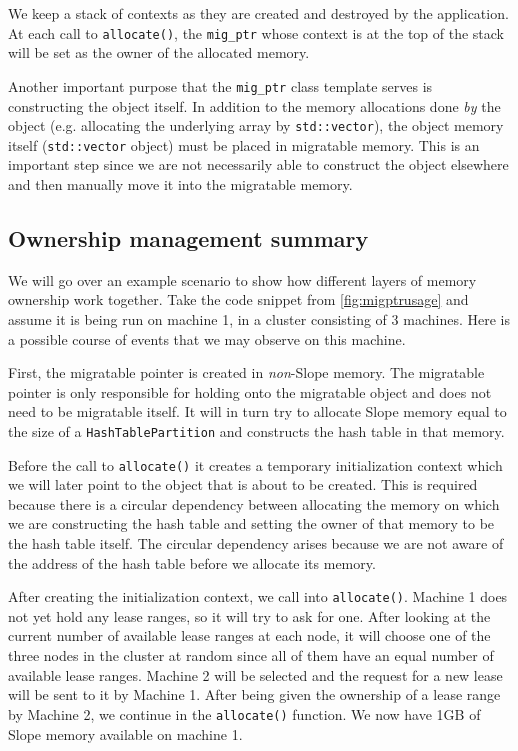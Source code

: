 We keep a stack of contexts as they are created and destroyed by the application.
At each call to \texttt{allocate()}, the \texttt{mig\_ptr} whose context is at
the top of the stack will be set as the owner of the allocated memory.

Another important purpose that the \texttt{mig\_ptr} class template serves is
constructing the object itself. In addition to the memory allocations done
\emph{by} the object (e.g. allocating the underlying array by \texttt{std::vector}),
the object memory itself (\texttt{std::vector} object) must be placed in
migratable memory. This is an important step since we are not necessarily able
to construct the object elsewhere and then manually move it into the migratable
memory.

\subsection{Ownership management summary}
We will go over an example scenario to show how different layers of memory
ownership work together. Take the code snippet from \autoref{fig:migptrusage}
and assume it is being run on machine 1, in a cluster consisting of 3 machines.
Here is a possible course of events that we may observe on this machine.

First, the migratable pointer is created in \emph{non}-Slope memory. The
migratable pointer is only responsible for holding onto the migratable object
and does not need to be migratable itself. It will in turn try to allocate
Slope memory equal to the size of a \texttt{HashTablePartition} and constructs the
hash table in that memory.

Before the call to \texttt{allocate()} it creates
a temporary initialization context which we will later point to the object
that is about to be created. This is required because there is a circular
dependency between allocating the memory on which we are constructing the
hash table and setting the owner of that memory to be the hash table itself.
The circular dependency arises because we are not aware of the address of the
hash table before we allocate its memory.

After creating the initialization context, we call into \texttt{allocate()}.
Machine 1 does not yet hold any lease ranges, so it will try to ask for one.
After looking at the current number of available lease ranges at each node,
it will choose one of the three nodes in the cluster at random since all of them
have an equal number of available lease ranges. Machine 2 will be selected and
the request for a new lease will be sent to it by Machine 1. After being given
the ownership of a lease range by Machine 2, we continue in the
\texttt{allocate()} function. We now have 1GB of Slope memory available on
machine 1.

